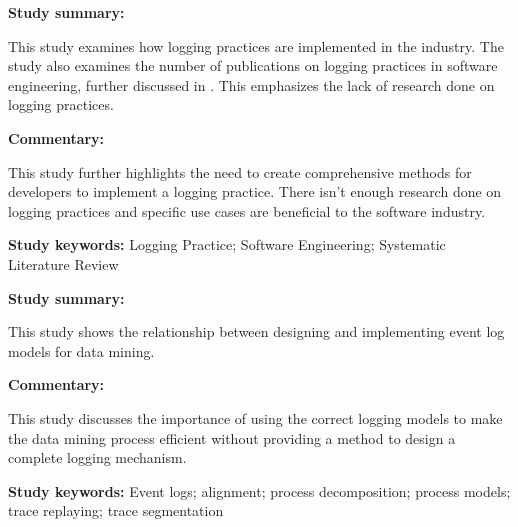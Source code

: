 \begin{tcolorbox}[colback=gray!5!white, colframe=deepblue!80!black, title=A Systematic Review of Logging Practice in Software Engineering\cite{Rong2018}]
	\begin{minipage}[t]{0.25\textwidth}
		\textbf{Study summary:}
	\end{minipage}
	\hfill
	\begin{minipage}[t]{0.65\textwidth}
		This study examines how logging practices are implemented in the industry. The study also examines the number of publications on logging practices in software engineering, further discussed in . This emphasizes the lack of research done on logging practices.
	\end{minipage}

	\vspace{0.75em} 

	\begin{minipage}[t]{0.25\textwidth}
		\textbf{Commentary:}
	\end{minipage}
	\hfill
	\begin{minipage}[t]{0.65\textwidth}
		This study further highlights the need to create comprehensive methods for developers to implement a logging practice. There isn't enough research done on logging practices and specific use cases are beneficial to the software industry. 
	\end{minipage}
	\tcblower
	\textbf{Study keywords:} Logging Practice; Software Engineering; Systematic Literature Review
\end{tcolorbox}

\begin{tcolorbox}[colback=gray!5!white, colframe=deepblue!80!black, title=Efficient Alignment Between Event Logs and Process Models\cite{Song2017}]
	\begin{minipage}[t]{0.25\textwidth}
		\textbf{Study summary:}
	\end{minipage}
	\hfill
	\begin{minipage}[t]{0.65\textwidth}
		This study shows the relationship between designing and implementing event log models for data mining.
	\end{minipage}

	\vspace{0.75em} 

	\begin{minipage}[t]{0.25\textwidth}
		\textbf{Commentary:}
	\end{minipage}
	\hfill
	\begin{minipage}[t]{0.65\textwidth}
		This study discusses the importance of using the correct logging models to make the data mining process efficient without providing a method to design a complete logging mechanism.
	\end{minipage}
	\tcblower
	\textbf{Study keywords:} Event logs; alignment; process decomposition; process models; trace replaying; trace segmentation
\end{tcolorbox}

